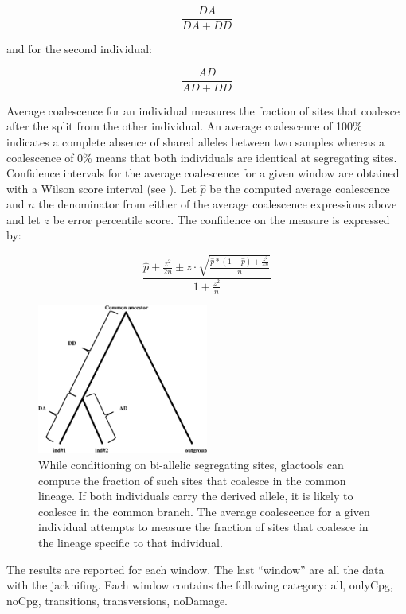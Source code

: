 \documentclass[a4paper]{article}
\begin{document}
\[
\frac { DA} { DA+DD }
\]

\noindent and for the second individual:

\[
\frac {AD} { AD+DD }
\]

Average coalescence for an individual measures the fraction of sites that coalesce after the split from the other individual. An average coalescence of 100\% indicates a complete absence of shared alleles between two samples whereas a coalescence of 0\% means that both individuals are identical at segregating sites. Confidence intervals for the average coalescence for a given window are obtained  with a Wilson score interval (see \cite{wilson1927probable}). Let $\hat{p}$ be the computed average coalescence and $n$ the denominator from either of the average coalescence expressions above and let $z$ be error percentile score. The confidence on the measure is expressed by:


\[
\frac{  \hat{p} + \frac {z^2} {2n} \pm z \cdot \sqrt {  \frac {\hat{p}*(1-\hat{p})+ \frac {z^2} {4n} } {n} }} {1+ \frac {z^2} {n} }
\]

\begin{figure}[!tpb]%
  \centerline{\includegraphics[width=0.5\textwidth,natwidth=510,natheight=542]{coasnowhite.eps}}
\caption{
While conditioning on bi-allelic segregating sites, glactools can compute the fraction of such sites that coalesce in the common lineage. If both individuals carry the derived allele, it is likely to coalesce in the common branch. The average coalescence for a given individual attempts to measure the fraction of sites that coalesce in the lineage specific to that individual.}
\label{fig:div}
\end{figure}


The results are reported for each window. The last ``window'' are all the data with the jacknifing. Each window contains the following category: all, onlyCpg, noCpg, transitions, transversions, noDamage.\\
\end{document}
